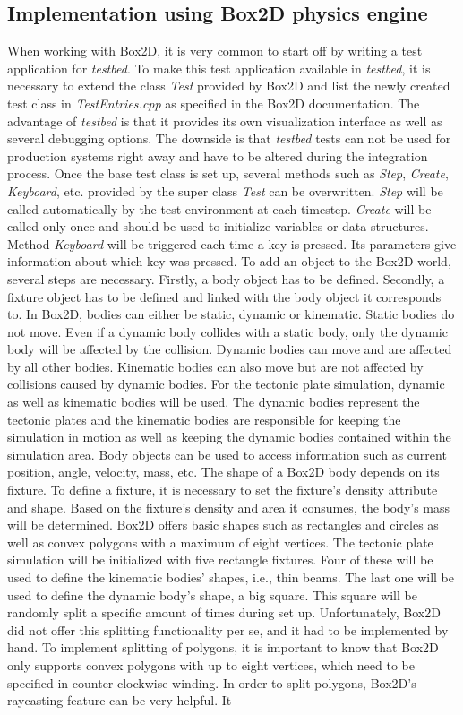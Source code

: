 \documentclass[11pt,a4paper,twoside,openright]{report}
\begin{document}
\subsection{Implementation using Box2D physics engine}
When working with Box2D, it is very common to start off by writing a test application for \emph{testbed}. To make this test application available in \emph{testbed}, it is necessary to extend the class \emph{Test} provided by Box2D and list the newly created test class in \emph{TestEntries.cpp} as specified in the Box2D documentation. The advantage of \emph{testbed} is that it provides its own visualization interface as well as several debugging options. The downside is that \emph{testbed} tests can not be used for production systems right away and have to be altered during the integration process.
Once the base test class is set up, several methods such as \emph{Step}, \emph{Create}, \emph{Keyboard}, etc. provided by the super class \emph{Test} can be overwritten. \emph{Step} will be called automatically by the test environment at each timestep. \emph{Create} will be called only once and should be used to initialize variables or data structures. Method \emph{Keyboard} will be triggered each time a key is pressed. Its parameters give information about which key was pressed. To add an object to the Box2D world, several steps are necessary. Firstly, a body object has to be defined. Secondly, a fixture object has to be defined and linked with the body object it corresponds to. In Box2D, bodies can either be static, dynamic or kinematic. Static bodies do not move. Even if a dynamic body collides with a static body, only the dynamic body will be affected by the collision. Dynamic bodies can move and are affected by all other bodies. Kinematic bodies can also move but are not affected by collisions caused by dynamic bodies. For the tectonic plate simulation, dynamic as well as kinematic bodies will be used. The dynamic bodies represent the tectonic plates and the kinematic bodies are responsible for keeping the simulation in motion as well as keeping the dynamic bodies contained within the simulation area. Body objects can be used to access information such as current position, angle, velocity, mass, etc. The shape of a Box2D body depends on its fixture. To define a fixture, it is necessary to set the fixture's density attribute and shape. Based on the fixture's density and area it consumes, the body's mass will be determined. Box2D offers basic shapes such as rectangles and circles as well as convex polygons with a maximum of eight vertices. The tectonic plate simulation will be initialized with five rectangle fixtures. Four of these will be used to define the kinematic bodies' shapes, i.e., thin beams. The last one will be used to define the dynamic body's shape, a big square. This square will be randomly split a specific amount of times during set up. Unfortunately, Box2D did not offer this splitting functionality per se, and it had to be implemented by hand. To implement splitting of polygons, it is important to know that Box2D only supports convex polygons with up to eight vertices, which need to be specified in counter clockwise winding. In order to split polygons, Box2D's raycasting feature can be very helpful. It 
\end{document}
